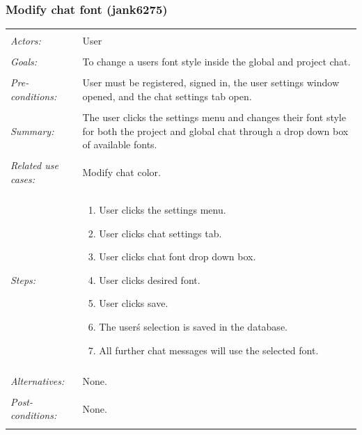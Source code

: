 \documentclass[11pt]{report}
\begin{document}
\subsubsection{Modify chat font (jank6275)}
\begin{tabular}{ p{2cm} p{12cm} }
 \hline
 \\
 \textit{Actors:} & User \\ 
 \\
 \textit{Goals:} & To change a users font style inside the global and project chat. \\
 \\
 \textit{Pre-conditions:} & User must be registered, signed in, the user settings window opened, and the chat settings tab open.  \\
 \\
 \textit{Summary:} & The user clicks the settings menu and changes their font style for both the project and global chat through a drop down box of available fonts. \\ 
 \\
 \textit{Related use cases:} & Modify chat color. \\ 
 \\
 \textit{Steps:} & \begin{enumerate}
  \item User clicks the settings menu.
  \item User clicks chat settings tab.
  \item User clicks chat font drop down box.
  \item User clicks desired font.
  \item User clicks save.
  \item The user\'s selection is saved in the database.
  \item All further chat messages will use the selected font.
 \end{enumerate} \\
 \\
 \textit{Alternatives:} & None. \\
 \\
 \textit{Post-conditions:} & None. \\
 \\
\hline
\end{tabular}
\end{document}
